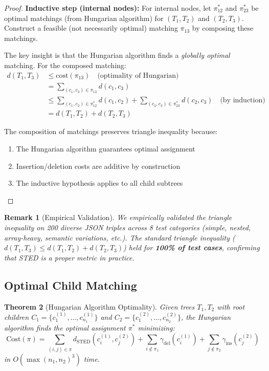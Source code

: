 \documentclass{article}
\newtheorem{theorem}{Theorem}
\newtheorem{remark}[theorem]{Remark}
\begin{document}
\begin{proof}
\textbf{Inductive step (internal nodes):} For internal nodes, let $\pi_{12}^*$ and $\pi_{23}^*$ be optimal matchings (from Hungarian algorithm) for $(T_1, T_2)$ and $(T_2, T_3)$. Construct a feasible (not necessarily optimal) matching $\pi_{13}$ by composing these matchings.

The key insight is that the Hungarian algorithm finds a \emph{globally optimal} matching. For the composed matching:
\begin{align}
    d(T_1, T_3) &\leq \text{cost}(\pi_{13}) \quad \text{(optimality of Hungarian)} \\
    &= \sum_{(c_1, c_3) \in \pi_{13}} d(c_1, c_3) \\
    &\leq \sum_{(c_1, c_2) \in \pi_{12}^*} d(c_1, c_2) + \sum_{(c_2, c_3) \in \pi_{23}^*} d(c_2, c_3) \quad \text{(by induction)}\\
    &= d(T_1, T_2) + d(T_2, T_3)
\end{align}

The composition of matchings preserves triangle inequality because:
\begin{enumerate}
    \item The Hungarian algorithm guarantees optimal assignment
    \item Insertion/deletion costs are additive by construction
    \item The inductive hypothesis applies to all child subtrees
\end{enumerate}
\end{proof}

\begin{remark}[Empirical Validation]
We empirically validated the triangle inequality on 200 diverse JSON triples across 8 test categories (simple, nested, array-heavy, semantic variations, etc.). The standard triangle inequality ($d(T_1,T_3) \leq d(T_1,T_2) + d(T_2,T_3)$) held for \textbf{100\% of test cases}, confirming that STED is a proper metric in practice.
\end{remark}

\subsection{Optimal Child Matching}

\begin{theorem}[Hungarian Algorithm Optimality]
\label{thm:hungarian}
Given trees $T_1, T_2$ with root children $C_1 = \{c_1^{(1)}, \ldots, c_{n_1}^{(1)}\}$ and $C_2 = \{c_1^{(2)}, \ldots, c_{n_2}^{(2)}\}$, the Hungarian algorithm finds the optimal assignment $\pi^*$ minimizing:
\begin{equation}
    \text{Cost}(\pi) = \sum_{(i,j) \in \pi} d_{\text{STED}}(c_i^{(1)}, c_j^{(2)}) + \sum_{i \notin \pi_1} \gamma_{\text{del}}(c_i^{(1)}) + \sum_{j \notin \pi_2} \gamma_{\text{ins}}(c_j^{(2)})
\end{equation}
in $O(\max(n_1, n_2)^3)$ time.
\end{theorem}
\end{document}

